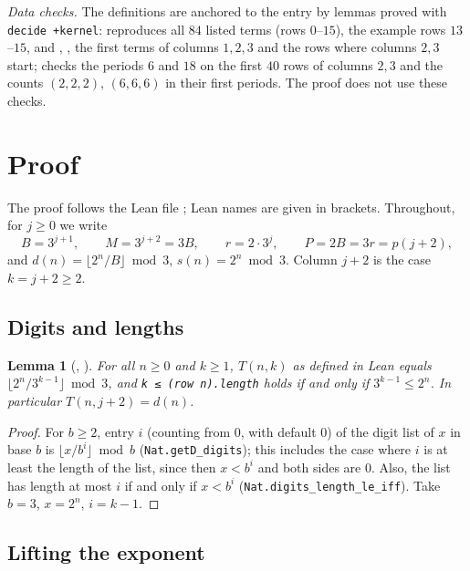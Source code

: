 \documentclass[11pt]{amsart}
\theoremstyle{plain}
\newtheorem{lemma}[theorem]{Lemma}
\theoremstyle{definition}
\begin{document}
\emph{Data checks.} The definitions are anchored to the entry by lemmas proved with \texttt{decide +kernel}:  reproduces all $84$ listed terms (rows $0$--$15$),  the example rows $13$--$15$, and , ,  the first terms of columns $1,2,3$ and the rows where columns $2,3$ start;  checks the periods $6$ and $18$ on the first $40$ rows of columns $2,3$ and the counts $(2,2,2)$, $(6,6,6)$ in their first periods. The proof does not use these checks.

\section{Proof}\label{sec:proof}

The proof follows the Lean file ; Lean names are given in brackets. Throughout, for $j\ge0$ we write
\[
  B=3^{j+1},\qquad M=3^{j+2}=3B,\qquad r=2\cdot3^j,\qquad P=2B=3r=p(j+2),
\]
and $d(n)=\lfloor 2^n/B\rfloor \bmod 3$, $s(n)=2^n \bmod 3$. Column $j+2$ is the case $k=j+2\ge2$.

\subsection{Digits and lengths}

\begin{lemma}[, ]\label{lem:digit}
For all $n\ge0$ and $k\ge1$, $T(n,k)$ as defined in Lean equals $\lfloor 2^n/3^{k-1}\rfloor \bmod 3$, and \texttt{k ≤ (row n).length} holds if and only if $3^{k-1}\le 2^n$. In particular $T(n,j+2)=d(n)$.
\end{lemma}

\begin{proof}
For $b\ge2$, entry $i$ (counting from $0$, with default $0$) of the digit list of $x$ in base $b$ is $\lfloor x/b^i\rfloor \bmod b$ (\texttt{Nat.getD\_digits}); this includes the case where $i$ is at least the length of the list, since then $x<b^i$ and both sides are $0$. Also, the list has length at most $i$ if and only if $x<b^i$ (\texttt{Nat.digits\_length\_le\_iff}). Take $b=3$, $x=2^n$, $i=k-1$.
\end{proof}

\subsection{Lifting the exponent}
\end{document}
